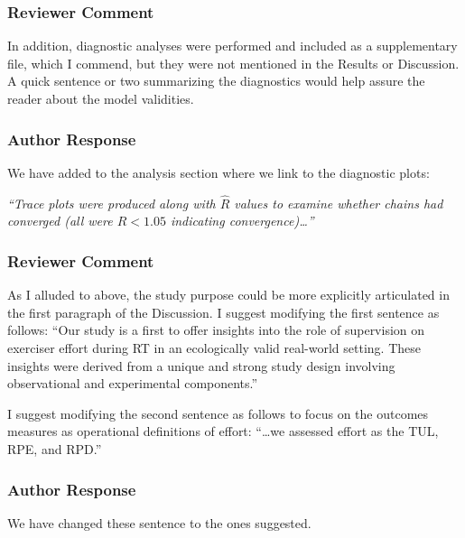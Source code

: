 \documentclass[
  letterpaper,
  DIV=11,
  numbers=noendperiod]{scrartcl}
\begin{document}
\hypertarget{reviewer-comment-13}{%
\subsubsection{Reviewer Comment}\label{reviewer-comment-13}}

In addition, diagnostic analyses were performed and included as a
supplementary file, which I commend, but they were not mentioned in the
Results or Discussion. A quick sentence or two summarizing the
diagnostics would help assure the reader about the model validities.

\hypertarget{author-response-13}{%
\subsubsection{Author Response}\label{author-response-13}}

We have added to the analysis section where we link to the diagnostic
plots:

\emph{``Trace plots were produced along with \(\hat{R}\) values to
examine whether chains had converged (all were \(\hat{R}<1.05\)
indicating convergence)\ldots{}''}

\hypertarget{reviewer-comment-14}{%
\subsubsection{Reviewer Comment}\label{reviewer-comment-14}}

As I alluded to above, the study purpose could be more explicitly
articulated in the first paragraph of the Discussion. I suggest
modifying the first sentence as follows: ``Our study is a first to offer
insights into the role of supervision on exerciser effort during RT in
an ecologically valid real-world setting. These insights were derived
from a unique and strong study design involving observational and
experimental components.''

I suggest modifying the second sentence as follows to focus on the
outcomes measures as operational definitions of effort: ``\ldots we
assessed effort as the TUL, RPE, and RPD.''

\hypertarget{author-response-14}{%
\subsubsection{Author Response}\label{author-response-14}}

We have changed these sentence to the ones suggested.
\end{document}
